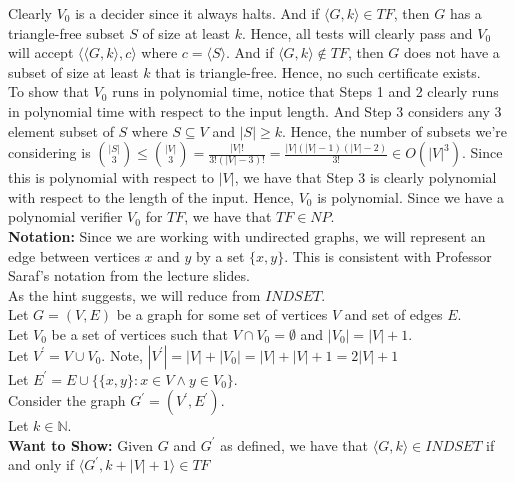 \documentclass[12pt]{article}
\newcommand{\N}{\mathbb{N}}
\begin{document}
Clearly $V_0$ is a decider since it always halts. And if $\langle G, k \rangle \in TF$, then $G$ has a triangle-free subset $S$ of size at least $k$. Hence, all tests will clearly pass and $V_0$ will accept $\langle \langle G, k \rangle, c \rangle$ where $c = \langle S \rangle$. And if $\langle G, k \rangle \not \in TF$, then $G$ does not have a subset of size at least $k$ that is triangle-free. Hence, no such certificate exists. \\

To show that $V_0$ runs in polynomial time, notice that Steps 1 and 2 clearly runs in polynomial time with respect to the input length. And Step 3 considers any $3$ element subset of $S$ where $S \subseteq V$ and $|S| \geq k$. Hence, the number of subsets we're considering is $\binom{|S|}{3} \leq \binom{|V|}{3} = \frac{|V|!}{3!(|V|-3)!} = \frac{|V|(|V|-1)(|V|-2)}{3!} \in O(|V|^3)$. Since this is polynomial with respect to $|V|$, we have that Step 3 is clearly polynomial with respect to the length of the input. Hence, $V_0$ is polynomial. Since we have a polynomial verifier $V_0$ for $TF$, we have that $TF \in NP$. \\


\textbf{Notation:} Since we are working with undirected graphs, we will represent an edge between vertices $x$ and $y$ by a set $\{x,y\}$. This is consistent with Professor Saraf's notation from the lecture slides. \\

As the hint suggests, we will reduce from $INDSET$. \\

Let $G = (V, E)$ be a graph for some set of vertices $V$ and set of edges $E$. \\

Let $V_0$ be a set of vertices such that $V \cap V_0 = \emptyset$ and $|V_0| = |V| + 1$. \\

Let $V^\prime = V \cup V_0$. Note, $|V^\prime| = |V| + |V_0| = |V| + |V| + 1 = 2|V| + 1$ \\

Let $E^\prime = E \cup \{\{x,y\} : x \in V \land y \in V_0\}$. \\

Consider the graph $G^\prime = (V^\prime, E^\prime)$. \\

Let $k \in \N$. \\

\textbf{Want to Show:} Given $G$ and $G^\prime$ as defined, we have that  $\langle G, k \rangle \in INDSET$ if and only if $\langle G^\prime, k + |V| + 1 \rangle \in TF$ \\
\end{document}
